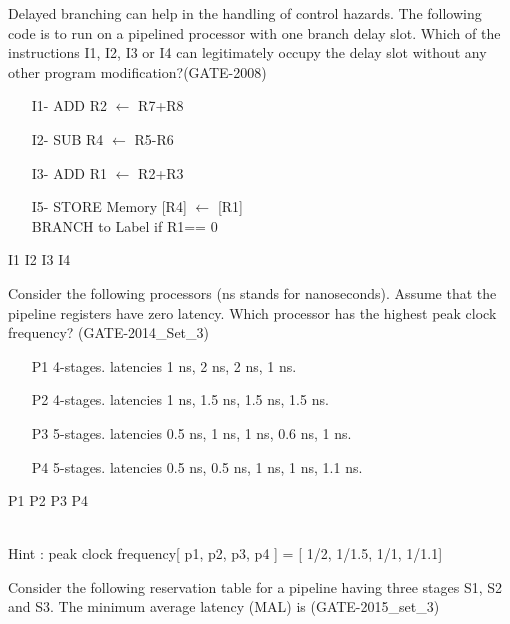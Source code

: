 \begin{questyle}
  \question  Delayed branching can help in the handling of control hazards. The following code is
             to run on a pipelined processor with one branch delay slot. Which of the instructions
             I1, I2, I3 or I4 can legitimately occupy the delay slot without any other program modification?(GATE-2008)

             \begin{enumerate}
                \item[I1-] ADD R2 \(\leftarrow\) R7+R8
                \item[I2-] SUB R4 \(\leftarrow\) R5-R6
                \item[I3-] ADD R1 \(\leftarrow\) R2+R3
                \item[I5-] STORE Memory [R4] \(\leftarrow\) [R1] \\
                 BRANCH to Label if R1== 0
            \end{enumerate}

  \begin{oneparchoices}
    \choice         I1
    \choice         I2
    \choice         I3
    \CorrectChoice  I4
  \end{oneparchoices}
\end{questyle}


\begin{questyle}
  \question  Consider the following processors (ns stands for nanoseconds). Assume that the pipeline registers
             have zero latency. Which processor has the highest peak clock frequency? (GATE-2014\_Set\_3)
    \begin{enumerate}
        \item[P1] 4-stages. latencies 1 ns, 2 ns, 2 ns, 1 ns.
        \item[P2] 4-stages. latencies 1 ns, 1.5 ns, 1.5 ns, 1.5 ns.
        \item[P3] 5-stages. latencies 0.5 ns, 1 ns, 1 ns, 0.6 ns, 1 ns.
        \item[P4] 5-stages. latencies 0.5 ns, 0.5 ns, 1 ns, 1 ns, 1.1 ns.
    \end{enumerate}
  \begin{oneparchoices}
    \choice         P1
    \choice         P2
    \CorrectChoice  P3
    \choice         P4
  \end{oneparchoices} \\
  Hint : peak clock frequency[ p1, p2, p3, p4 ] = [ 1/2, 1/1.5, 1/1, 1/1.1]
\end{questyle}


\begin{questyle}
  \question  Consider the following reservation table for a pipeline having three
             stages S1, S2 and S3. The minimum average latency (MAL) is \fillin[1]  (GATE-2015\_set\_3)

\end{questyle}

\begin{comment}

\end{comment}




